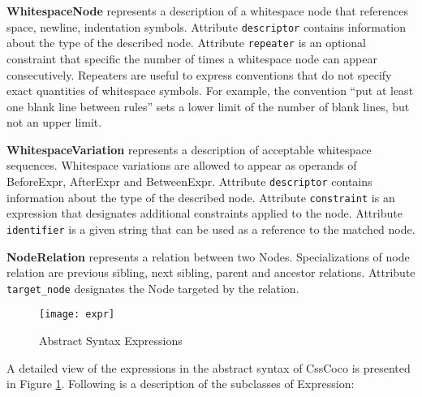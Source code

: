 \documentclass[parskip=full]{uvamscse}
\begin{document}
\begin{description}
\item\textbf{WhitespaceNode} represents a description of a whitespace node that references space, newline, indentation symbols. Attribute \texttt{descriptor} contains information about the type of the described node. Attribute \texttt{repeater} is an optional constraint that specific the number of times a whitespace node can appear consecutively. Repeaters are useful to express conventions that do not specify exact quantities of whitespace symbols. For example, the convention ``put at least one blank line between rules'' sets a lower limit of the number of blank lines, but not an upper limit.


\item\textbf{WhitespaceVariation} represents a description of acceptable whitespace sequences. Whitespace variations are allowed to appear as operands of BeforeExpr, AfterExpr and BetweenExpr.  Attribute \texttt{descriptor} contains information about the type of the described node. Attribute \texttt{constraint} is an expression that designates additional constraints applied to the node. Attribute \texttt{identifier} is a given string that can be used as a reference to the matched node.


\item\textbf{NodeRelation} represents a relation between two Nodes. Specializations of node relation are previous sibling, next sibling, parent and ancestor relations. Attribute \texttt{target\_node} designates the Node targeted by the relation.

\end{description}


\begin{figure}[h!]
  \centering
  \caption{Abstract Syntax Expressions}
  \label{fig:expressions}
  \texttt{[image: expr]}
\end{figure}

A detailed view of the expressions in the abstract syntax of CssCoco is presented in Figure \ref{fig:expressions}. Following is a description of the subclasses of Expression:
\end{document}
